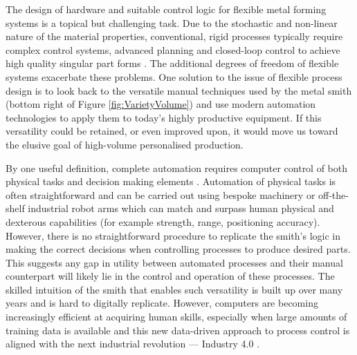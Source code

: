 The design of hardware and suitable control logic for flexible metal forming systems is a topical but challenging task. Due to the stochastic and non-linear nature of the material properties, conventional, rigid processes typically require complex control systems, advanced planning and closed-loop control to achieve high quality singular part forms \citep{Allwood2016Closed-loopForming, Tekkaya2015MetalProperties, Polyblank2014Closed-loopProspectus}. The additional degrees of freedom of flexible systems exacerbate these problems. One solution to the issue of flexible process design is to look back to the versatile manual techniques used by the metal smith (bottom right of Figure \ref{fig:VarietyVolume}) and use modern automation technologies to apply them to today’s highly productive equipment. If this versatility could be retained, or even improved upon, it would move us toward the elusive goal of high-volume personalised production. 



By one useful definition, complete automation requires computer control of both physical tasks and decision making elements \citep{Frohm2008LevelsManufacturing}. Automation of physical tasks is often straightforward and can be carried out using bespoke machinery or off-the-shelf industrial robot arms which can match and surpass human physical and dexterous capabilities (for example strength, range, positioning accuracy). However, there is no straightforward procedure to replicate the smith's logic in making the correct decisions when controlling processes to produce desired parts. This suggests any gap in utility between automated processes and their manual counterpart will likely lie in the control and operation of these processes. The skilled intuition of the smith that enables such versatility is built up over many years and is hard to digitally replicate. However, computers are becoming increasingly efficient at acquiring human skills, especially when large amounts of training data is available \citep{Ford2016TheUnemployment} and this new data-driven approach to process control is aligned with the next industrial revolution --- Industry 4.0 \citep{Zhong2017IntelligentReview}. 

